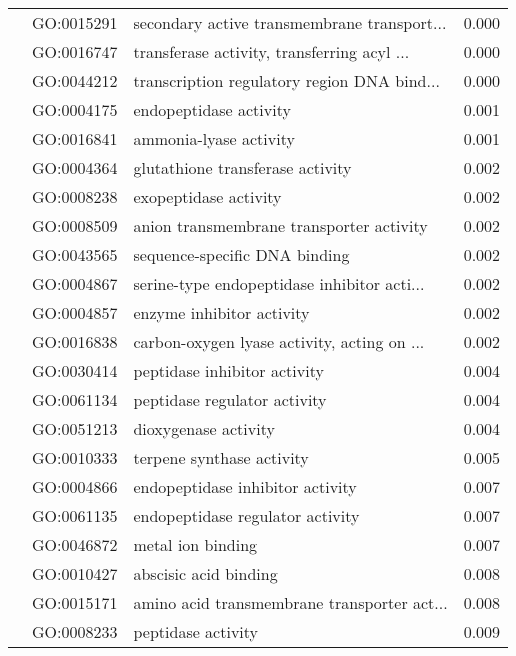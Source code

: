 \begin{longtable}{lllr}
   & GO:0015291 &  secondary active transmembrane transport... &         0.000 \\
   & GO:0016747 &  transferase activity, transferring acyl ... &         0.000 \\
   & GO:0044212 &  transcription regulatory region DNA bind... &         0.000 \\
   & GO:0004175 &                       endopeptidase activity &         0.001 \\
   & GO:0016841 &                       ammonia-lyase activity &         0.001 \\
   & GO:0004364 &             glutathione transferase activity &         0.002 \\
   & GO:0008238 &                        exopeptidase activity &         0.002 \\
   & GO:0008509 &     anion transmembrane transporter activity &         0.002 \\
   & GO:0043565 &                sequence-specific DNA binding &         0.002 \\
   & GO:0004867 &  serine-type endopeptidase inhibitor acti... &         0.002 \\
   & GO:0004857 &                    enzyme inhibitor activity &         0.002 \\
   & GO:0016838 &  carbon-oxygen lyase activity, acting on ... &         0.002 \\
   & GO:0030414 &                 peptidase inhibitor activity &         0.004 \\
   & GO:0061134 &                 peptidase regulator activity &         0.004 \\
   & GO:0051213 &                         dioxygenase activity &         0.004 \\
   & GO:0010333 &                    terpene synthase activity &         0.005 \\
   & GO:0004866 &             endopeptidase inhibitor activity &         0.007 \\
   & GO:0061135 &             endopeptidase regulator activity &         0.007 \\
   & GO:0046872 &                            metal ion binding &         0.007 \\
   & GO:0010427 &                        abscisic acid binding &         0.008 \\
   & GO:0015171 &  amino acid transmembrane transporter act... &         0.008 \\
   & GO:0008233 &                           peptidase activity &         0.009 \\

\end{longtable}
